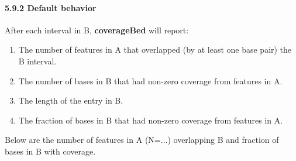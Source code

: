 \documentclass[letterpaper,10pt,english]{sphinxmanual}
\begin{document}
\paragraph{5.9.2 Default behavior}
\label{content/coverageBed:default-behavior}
After each interval in B, \textbf{coverageBed} will report:
\begin{enumerate}
\item {} 
The number of features in A that overlapped (by at least one base pair) the B interval.

\item {} 
The number of bases in B that had non-zero coverage from features in A.

\item {} 
The length of the entry in B.

\item {} 
The fraction of bases in B that had non-zero coverage from features in A.

\end{enumerate}

Below are the number of features in A (N=...) overlapping B and fraction of bases in B with coverage.
\end{document}
